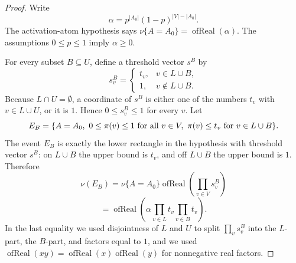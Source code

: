\begin{proof}
Write
\[
\alpha=p^{|A_0|}(1-p)^{|V|-|A_0|}.
\]
The activation-atom hypothesis says \(\nu\{A=A_0\}=\operatorname{ofReal}(\alpha)\).
The assumptions \(0\le p\le1\) imply \(\alpha\ge0\).

For every subset \(B\subseteq U\), define a threshold vector \(s^B\) by
\[
s^B_v=
\begin{cases}
t_v,& v\in L\cup B,\\
1,& v\notin L\cup B.
\end{cases}
\]
Because \(L\cap U=\emptyset\), a coordinate of \(s^B\) is either one of the
numbers \(t_v\) with \(v\in L\cup U\), or it is \(1\).  Hence
\(0\le s^B_v\le1\) for every \(v\).  Let
\[
E_B=\{A=A_0,\ 0\le\pi(v)\le1\hbox{ for all }v\in V,\ 
        \pi(v)\le t_v\hbox{ for }v\in L\cup B\}.
\]
The event \(E_B\) is exactly the lower rectangle in the hypothesis with
threshold vector \(s^B\): on \(L\cup B\) the upper bound is \(t_v\), and off
\(L\cup B\) the upper bound is \(1\).  Therefore
\[
\nu(E_B)
=\nu\{A=A_0\}\operatorname{ofReal}\!\left(\prod_{v\in V}s^B_v\right)
\]
\[
=
\operatorname{ofReal}\!\left(
\alpha
\prod_{v\in L}t_v
\prod_{v\in B}t_v\right).
\tag{1}
\]
In the last equality we used disjointness of \(L\) and \(U\) to split
\(\prod_v s^B_v\) into the \(L\)-part, the \(B\)-part, and factors equal to
\(1\), and we used \(\operatorname{ofReal}(xy)=\operatorname{ofReal}(x)
\operatorname{ofReal}(y)\) for nonnegative real factors.


\end{proof}
